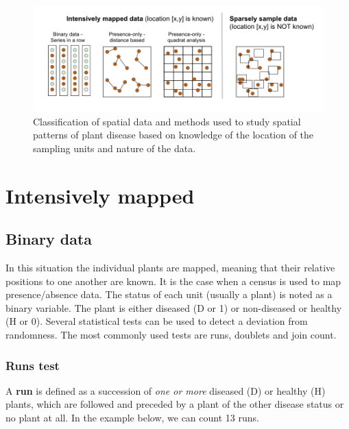 \documentclass[
  letterpaper,
  DIV=11,
  numbers=noendperiod]{scrreprt}
\begin{document}
\begin{figure}

{\centering \includegraphics{imgs/spatial_methods.png}

}

\caption{\label{fig-spatialmethods}Classification of spatial data and
methods used to study spatial patterns of plant disease based on
knowledge of the location of the sampling units and nature of the data.}

\end{figure}

\hypertarget{intensively-mapped}{%
\section{Intensively mapped}\label{intensively-mapped}}

\hypertarget{binary-data}{%
\subsection{Binary data}\label{binary-data}}

In this situation the individual plants are mapped, meaning that their
relative positions to one another are known. It is the case when a
census is used to map presence/absence data. The status of each unit
(usually a plant) is noted as a binary variable. The plant is either
diseased (D or 1) or non-diseased or healthy (H or 0). Several
statistical tests can be used to detect a deviation from randomness. The
most commonly used tests are runs, doublets and join count.

\hypertarget{runs-test}{%
\subsubsection{Runs test}\label{runs-test}}

A \textbf{run} is defined as a succession of \emph{one or more} diseased
(D) or healthy (H) plants, which are followed and preceded by a plant of
the other disease status or no plant at all. In the example below, we
can count 13 runs.
\end{document}
